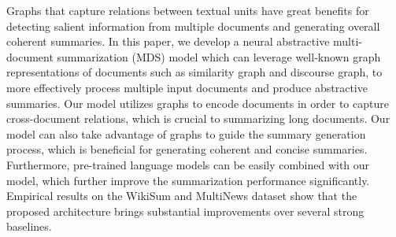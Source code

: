 Graphs that capture relations between textual units have great benefits for detecting salient information from multiple documents and generating overall coherent summaries. In this paper, we develop a neural abstractive multi-document summarization (MDS) model which can leverage well-known graph representations of documents such as similarity graph and discourse graph, to more effectively process multiple input documents and produce abstractive summaries. Our model utilizes graphs to encode documents in order to capture cross-document relations, which is crucial to summarizing long documents. Our model can also take advantage of graphs to guide the summary generation process, which is beneficial for generating coherent and concise summaries. Furthermore, pre-trained language models can be easily combined with our model, which further improve the summarization performance significantly. Empirical results on the WikiSum and MultiNews dataset show that the proposed architecture brings substantial improvements over several strong baselines.
